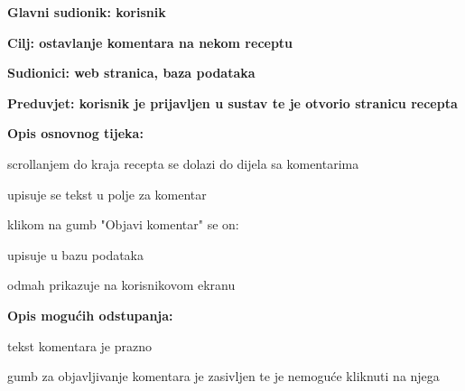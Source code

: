					
					
					\noindent {}
					\begin{packed_item}
						\item \textbf{Glavni sudionik: korisnik}
						\item  \textbf{Cilj: ostavlanje komentara na nekom receptu}
						\item  \textbf{Sudionici: web stranica, baza podataka}
						\item  \textbf{Preduvjet: korisnik je prijavljen u sustav te je otvorio stranicu recepta}
						
						\item  \textbf{Opis osnovnog tijeka:}
						\item[] \begin{packed_enum}
							\item scrollanjem do kraja recepta se dolazi do dijela sa komentarima
							\item upisuje se tekst u polje za komentar
							\item klikom na gumb "Objavi komentar" se on:
							\begin{packed_enum}
								\item upisuje u bazu podataka
								\item odmah prikazuje na korisnikovom ekranu
							\end{packed_enum}
						\end{packed_enum}
						
						\item  \textbf{Opis mogućih odstupanja:}
						\item[] \begin{packed_item}
							\item[2.a] tekst komentara je prazno
							\begin{packed_enum}
								\item gumb za objavljivanje komentara je zasivljen te je nemoguće kliknuti na njega
							\end{packed_enum}
						\end{packed_item}
					\end{packed_item}
				
				
				
